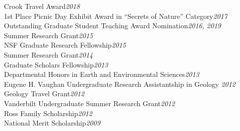 \documentclass[11pt,margin,line]{resume}
\begin{document}
\begin{resume}
Crook Travel Award\hfill \emph{2018}\\
1st Place Picnic Day Exhibit Award in “Secrets of Nature” Category\hfill \emph{2017}\\
Outstanding Graduate Student Teaching Award Nomination\hfill \emph{2016, 2019}\\
Summer Research Grant\hfill \emph{2015}\\
NSF Graduate Research Fellowship\hfill \emph{2015}\\
Summer Research Grant\hfill \emph{2014}\\
Graduate Scholars Fellowship\hfill \emph{2013}\\
Departmental Honors in Earth and Environmental Sciences\hfill \emph{2013}\\
Eugene H. Vaughan Undergraduate Research Assistantship in Geology \hfill \emph{2012}\\
Geology Travel Grant\hfill \emph{2012}\\
Vanderbilt Undergraduate Summer Research Grant\hfill \emph{2012}\\
Ross Family Scholarship\hfill \emph{2012}\\
National Merit Scholarship\hfill \emph{2009}\\\\\\\\

\begin{comment}


\end{comment}
\end{resume}
\end{document}
